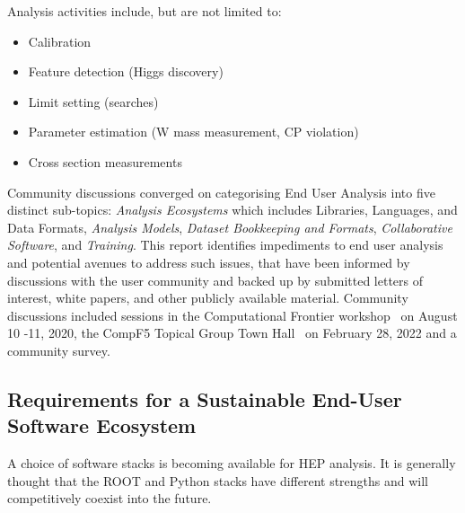 Analysis activities include, but are not limited to:
\begin{itemize}
  \item Calibration
  \item Feature detection (Higgs discovery)
  \item Limit setting (searches)
  \item Parameter estimation (W mass measurement, CP violation)
  \item Cross section measurements
\end{itemize}

Community discussions converged on categorising End User Analysis into five distinct sub-topics: \textit{Analysis Ecosystems} which includes Libraries, Languages, and Data Formats, \textit{Analysis Models}, \textit{Dataset Bookkeeping and Formats}, \textit{Collaborative Software}, and \textit{Training}.
This report identifies impediments to end user analysis and potential avenues to address such issues, that have been informed by discussions with the user community and backed up by submitted letters of interest, white papers, and other publicly available material. Community discussions included sessions in the Computational Frontier workshop~\cite{CompF-workshop} on August 10 -11, 2020, the CompF5 Topical Group Town Hall~\cite{CompF5-TownHall} on February 28, 2022 and a community survey.


\subsection{Requirements for a Sustainable End-User Software Ecosystem}
A choice of software stacks is becoming available for HEP analysis. It is generally thought that the ROOT and Python stacks have different strengths and will competitively coexist into the future.

